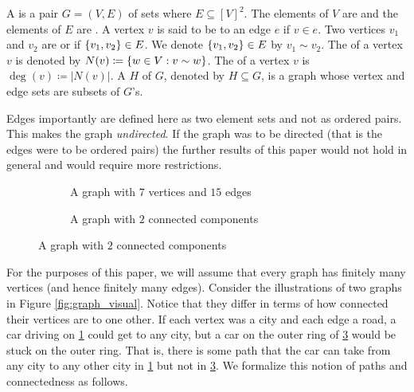 \documentclass[11pt]{article}
\begin{document}
\begin{definition}
    A  is a pair $G = (V, E)$ of sets where $E \subseteq [V]^2$. The elements of $V$ are  and the elements of $E$ are . A vertex $v$ is said to be  to an edge $e$ if $v \in e$. Two vertices $v_1$ and $v_2$ are  or  if $\qty{v_1, v_2} \in E$. We denote $\qty{v_1, v_2} \in E$ by $v_1 \sim v_2$. The  of a vertex $v$ is denoted by $N(v) \coloneq \qty{w \in V : v \sim w}$. The  of a vertex $v$ is $\deg(v) \coloneq |N(v)|$. A  $H$ of $G$, denoted by $H \subseteq G$, is a graph whose vertex and edge sets are subsets of $G$'s.
\end{definition}

\begin{remark}
    Edges importantly are defined here as two element sets and not as ordered pairs. This makes the graph \textit{undirected}. If the graph was to be directed (that is the edges were to be ordered pairs) the further results of this paper would not hold in general and would require more restrictions.
\end{remark}

\begin{figure}
    \centering
    \caption{Two example graphs in the plane}
    \label{fig:graph_visual}
    \begin{subfigure}[t]{0.45\textwidth}
        \centering
        \caption{A graph with $7$ vertices and $15$ edges}
        \label{fig:basic_graph}
    \end{subfigure}\hfill
    \begin{subfigure}[t]{0.45\textwidth}
        \centering
        \caption{A graph with $2$ connected components}
        \label{fig:connected_components}
    \end{subfigure}
\end{figure}

For the purposes of this paper, we will assume that every graph has finitely many vertices (and hence finitely many edges). Consider the illustrations of two graphs in Figure \ref{fig:graph_visual}. Notice that they differ in terms of how connected their vertices are to one other. If each vertex was a city and each edge a road, a car driving on \ref{fig:basic_graph} could get to any city, but a car on the outer ring of \ref{fig:connected_components} would be stuck on the outer ring. That is, there is some path that the car can take from any city to any other city in \ref{fig:basic_graph} but not in \ref{fig:connected_components}. We formalize this notion of paths and connectedness as follows.
\end{document}
